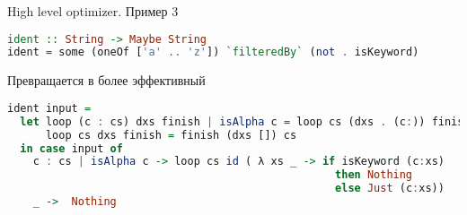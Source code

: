 



\begin{frame}[fragile]{High level optimizer. Пример 3}
\begin{lstlisting}[language=haskell]
ident :: String -> Maybe String
ident = some (oneOf ['a' .. 'z']) `filteredBy` (not . isKeyword)
\end{lstlisting}
Превращается в более эффективный
\begin{lstlisting}[language=haskell]
ident input =
  let loop (c : cs) dxs finish | isAlpha c = loop cs (dxs . (c:)) finish
      loop cs dxs finish = finish (dxs []) cs
  in case input of
    c : cs | isAlpha c -> loop cs id ( λ xs _ -> if isKeyword (c:xs)
                                                   then Nothing 
                                                   else Just (c:xs))
    _ ->  Nothing
\end{lstlisting}
\end{frame}








